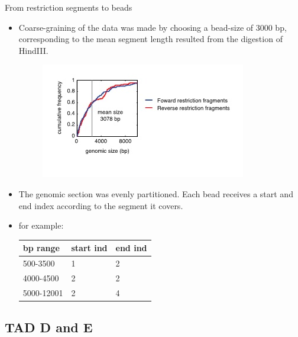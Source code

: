 \documentclass[8pt]{beamer}
\begin{document}
\begin{frame}{From restriction segments to beads}
\begin{itemize}
\item Coarse-graining of the data was made by choosing a bead-size of 3000 bp, corresponding to the mean segment length resulted from the digestion of HindIII. 

\begin{figure}[H]
\includegraphics[scale=0.55]{restrictionSegmentLengthDistributionLucaetal}
\end{figure}
\item The genomic section was evenly partitioned. Each bead receives a start and end index according to the segment it covers. 
\item for example: 
\begin{tabular}[H]{|l| l| l|}
\hline
bp range & start ind & end ind\\
\hline
500-3500   & 1         & 2 \\
4000-4500  & 2         & 2 \\   
5000-12001 & 2         & 4 \\       
\hline  
\end{tabular}
\end{itemize}
\end{frame}

\subsection{TAD D and E}\label{subsection_tadDAndE}
\end{document}
